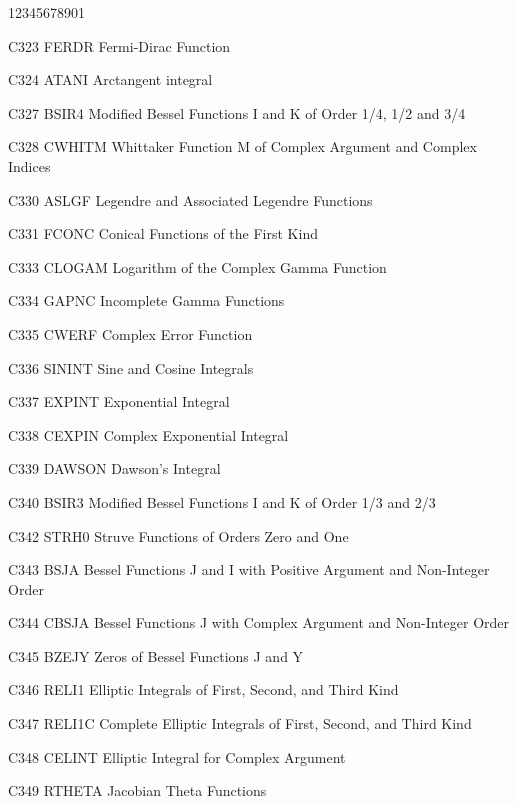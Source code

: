 \begin{DLtt}{12345678901}
\item[C323 FERDR] Fermi-Dirac Function
\item[C324 ATANI] Arctangent integral
\item[C327 BSIR4] Modified Bessel Functions I and K of Order 1/4, 1/2 and 3/4
\item[C328 CWHITM] Whittaker Function M of Complex Argument and Complex Indices
\item[C330 ASLGF] Legendre and Associated Legendre Functions 
\item[C331 FCONC] Conical Functions of the First Kind
\item[C333 CLOGAM] Logarithm of the Complex Gamma Function
\item[C334 GAPNC] Incomplete Gamma Functions
\item[C335 CWERF] Complex Error Function
\item[C336 SININT] Sine and Cosine Integrals
\item[C337 EXPINT] Exponential Integral
\item[C338 CEXPIN] Complex Exponential Integral
\item[C339 DAWSON] Dawson's Integral
\item[C340 BSIR3] Modified Bessel Functions I and K of Order 1/3 and 2/3
\item[C342 STRH0] Struve Functions of Orders Zero and One
\item[C343 BSJA] Bessel Functions J and I with Positive Argument and Non-Integer Order
\item[C344 CBSJA] Bessel Functions J with Complex Argument and Non-Integer Order
\item[C345 BZEJY] Zeros of Bessel Functions J and Y
\item[C346 RELI1] Elliptic Integrals of First, Second, and Third Kind
\item[C347 RELI1C] Complete Elliptic Integrals of First, Second, and Third Kind
\item[C348 CELINT] Elliptic Integral for Complex Argument
\item[C349 RTHETA] Jacobian Theta Functions
\end{DLtt}
